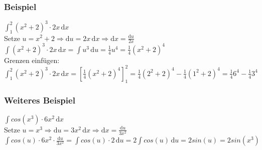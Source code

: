 \documentclass[a4paper,portrait]{scrartcl}
\begin{document}
\subsubsection*{Beispiel}
$ \int_{1}^{2} \!(x^2+2)^3 \cdot 2x \,\mathrm{d}x $ \\
Setze $ u = x^2 + 2 \Rightarrow \mathrm{d}u = 2x \,\mathrm{d}x \Rightarrow \mathrm{d}x = \frac{\mathrm{d}u}{2x}$ \\
$ \int \!(x^2+2)^3 \cdot 2x \,\mathrm{d}x = \int \! u^3 \,\mathrm{d}u = \frac{1}{4}u^4 = \frac{1}{4}(x^2+2)^4$ \\
Grenzen einfügen: $ \int_{1}^{2} \!(x^2+2)^3 \cdot 2x \,\mathrm{d}x = \left[ \frac{1}{4}(x^2+2)^4 \right]_1^2 = \frac{1}{4}(2^2+2)^4 - \frac{1}{4}(1^2+2)^4 = \frac{1}{4}6^4 - \frac{1}{4}3^4$
\subsubsection*{Weiteres Beispiel}
$ \int \!cos(x^3) \cdot 6x^2 \,\mathrm{d}x $ \\
Setze $ u = x^3 \Rightarrow \mathrm{d}u = 3x^2 \,\mathrm{d}x \Rightarrow \mathrm{d}x = \frac{\mathrm{d}u}{3x^2}$ \\
$ \int \!cos(u) \cdot 6x^2 \cdot \frac{\mathrm{d}u}{3x^2} = \int \!cos(u) \cdot 2 \,\mathrm{d}u = 2 \int \!cos(u) \,\mathrm{d}u = 2 sin(u) = 2 sin(x^3)$
\end{document}
